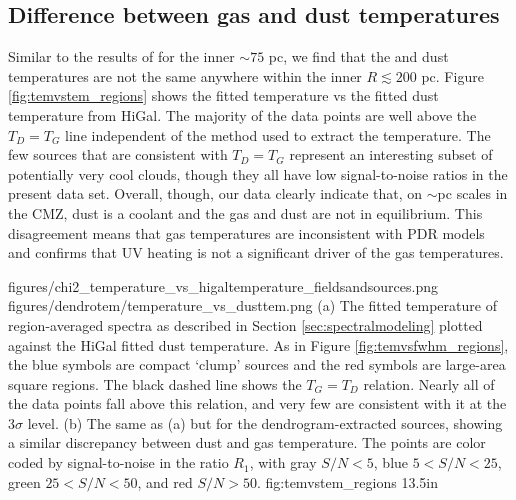 \subsection{Difference between gas and dust temperatures}
\label{sec:td_ne_tg}
Similar to the results of \citet{Ao2013a} for the inner $\sim75$ pc, we find
that the \para and dust temperatures are not the same anywhere within the
inner $R\lesssim200$ pc.  Figure \ref{fig:temvstem_regions} shows the fitted \para
temperature vs the fitted dust temperature from HiGal.  The majority of the
\formaldehyde data points are well above the $T_{D}=T_{G}$ line
independent of the method used to extract the temperature.  The few sources
that are consistent with $T_{D}=T_{G}$ represent an interesting subset
of potentially very cool clouds, though they all have low signal-to-noise
ratios in the present data set.  Overall, though, our data clearly indicate
that, on $\sim$pc scales in the CMZ, dust is a coolant and the gas and dust are
not in equilibrium.  This disagreement means that gas temperatures are
inconsistent with PDR models \citep{Hollenbach1999a} and confirms that UV
heating is not a significant driver of the gas temperatures.


\FigureTwo
{figures/chi2_temperature_vs_higaltemperature_fieldsandsources.png} %
{figures/dendrotem/temperature_vs_dusttem.png} %
{(a) The fitted temperature of region-averaged spectra as described in
Section \ref{sec:spectralmodeling} plotted against the HiGal fitted dust
temperature.  As in Figure \ref{fig:temvsfwhm_regions}, the blue symbols are
compact `clump' sources and the red symbols are large-area square regions.  The
black dashed line shows the $T_G = T_D$ relation.  Nearly all of the data
points fall above this relation, and very few are consistent with it at the
3$\sigma$ level.
(b) The same as (a) but for the dendrogram-extracted sources, showing a similar
discrepancy between dust and gas temperature.  The points are color coded by
signal-to-noise in the
ratio $R_1$, with gray $S/N < 5$, blue $5 < S/N < 25$, green $25 < S/N < 50$,
and red $S/N > 50$.  }
{fig:temvstem_regions}
{1}{3.5in}

